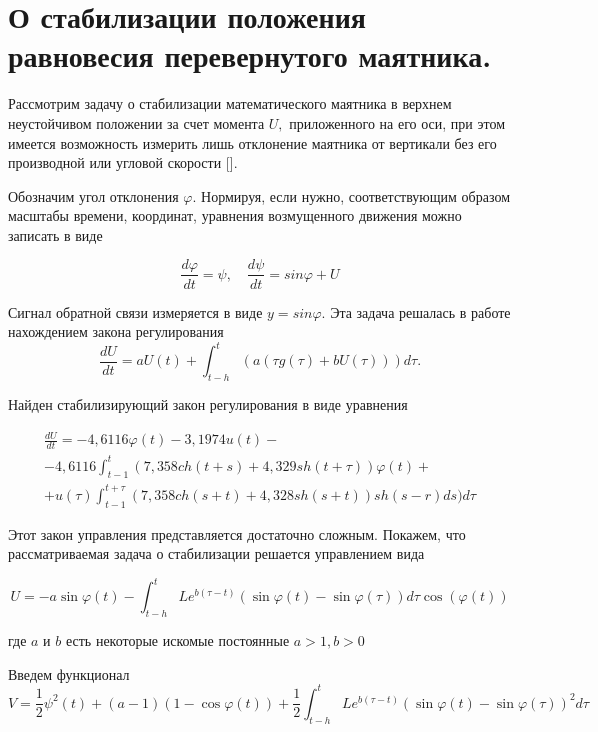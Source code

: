 \section{О стабилизации положения равновесия перевернутого маятника.} \label{p14}

Рассмотрим задачу о стабилизации математического маятника в верхнем неустойчивом положении за счет момента $U,$ приложенного на его оси, при этом имеется возможность измерить лишь отклонение маятника от вертикали без его производной или угловой скорости [].

Обозначим угол отклонения $\varphi.$ Нормируя, если нужно, соответствующим образом масштабы времени, координат, уравнения возмущенного движения можно записать в виде

\begin{equation} \label{1.45'}
\frac{d \varphi}{dt} = \psi, \quad \frac{d \psi}{dt} = sin \varphi + U
\end{equation}

Сигнал обратной связи измеряется в виде $y = sin \varphi$. Эта задача решалась в работе \cite{krasovsk63} нахождением закона регулирования $$\frac{d U}{d t} = a U(t) + \int_{t - h}^{t} (a (\tau g (\tau) + b U (\tau))) d \tau.$$

Найден стабилизирующий закон регулирования в виде уравнения

\begin{equation} \label{1.46'}
\begin{array}{c}
\displaystyle \frac{d U}{d t} = - 4,6116 \varphi (t) - 3,1974 u(t) -\\
\displaystyle - 4,6116 \int_{t - 1}^{t} (7,358 ch(t + s) + 4,329 sh(t + \tau)) \varphi (t) +\\
\displaystyle + u(\tau) \int_{t - 1}^{t + \tau} (7,358 ch(s + t) + 4,328 sh(s + t)) sh(s - r) ds) d \tau
\end{array}
\end{equation}

Этот закон управления представляется достаточно сложным. Покажем, что рассматриваемая задача о стабилизации решается управлением вида 

\begin{equation} \label{1.47'}
U = - a \sin \varphi (t) - \int_{t-h}^{t} L e^{ b (\tau - t)} (\sin \varphi (t) - \sin \varphi (\tau)) d \tau \cos (\varphi(t))
\end{equation}

где $a$ и $b$ есть некоторые искомые постоянные $a > 1, b > 0$

Введем функционал $$V = \frac12 \psi ^ 2 (t) + (a - 1) (1 - \cos \varphi (t)) + \frac12 \int_{t-h}^{t} L e^{b (\tau - t)} (\sin \varphi(t) - \sin \varphi (\tau))^2 d \tau$$

